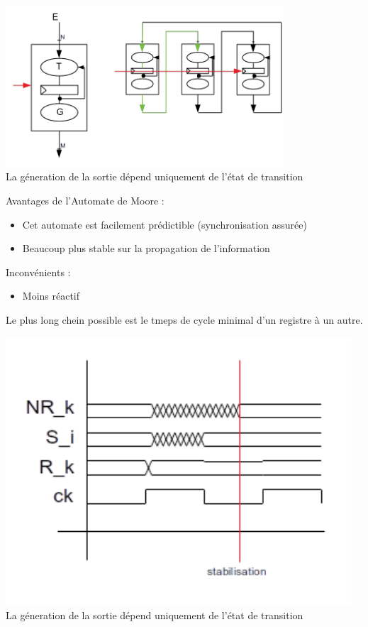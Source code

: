 \begin{center}
  \includegraphics[height=6cm]{cours1/pics/moore.png}
  \\ La géneration de la sortie dépend uniquement de l'état de transition
\end{center}
Avantages de l'Automate de Moore :
\begin{itemize}
  \item Cet automate est facilement prédictible (synchronisation assurée)
  \item Beaucoup plus stable sur la propagation de l'information
\end{itemize}
Inconvénients :
\begin{itemize}
  \item Moins réactif
\end{itemize}
Le plus long chein possible est le tmeps de cycle minimal d'un registre à un
autre.
\begin{center}
  \includegraphics[height=10cm]{cours1/pics/chrono.png}
  \\ La géneration de la sortie dépend uniquement de l'état de transition
\end{center}

